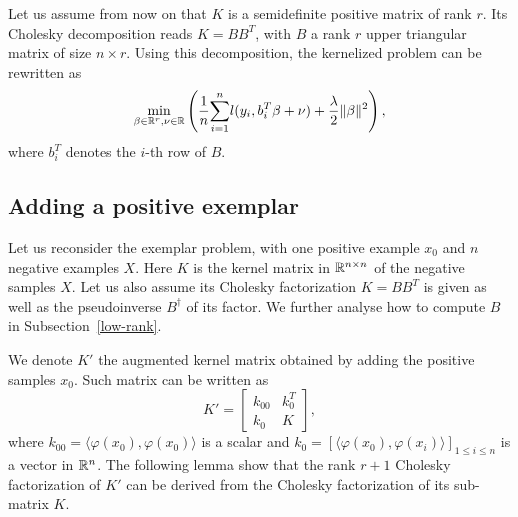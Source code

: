 
Let us assume from now on that $K$ is a semidefinite positive matrix
of rank $r$. Its Cholesky decomposition reads $K=BB^T$, with $B$ a rank $r$ upper triangular matrix of size $n\times r$. Using this decomposition, the kernelized problem can be rewritten as 
\begin{equation}
\min_{\beta\in\mathbb R^r,\nu\in\mathbb R} \left( \dfrac{1}{n}\displaystyle{\sum_{i=1}^n} l(y_i, b_i^T\beta+\nu)+\dfrac{\lambda}{2}\|\beta\|^2\right), \label{beta:first}
\end{equation}
where $b_i^T$ denotes the $i$-th row of $B$.

\subsection{Adding a positive exemplar}
\label{subsec:adding}
Let us reconsider the exemplar problem, with one positive example $x_0$ and $n$ negative examples $X$. Here $K$ is the kernel matrix in $\mathbb R^{n\times n}$ of the negative samples $X$. 
Let us also assume its Cholesky factorization $K=BB^T$ is given as well as the pseudoinverse $B^\dagger$ of its factor. We further analyse how to compute $B$ in Subsection~\ref{low-rank}.

We denote $K'$ the augmented kernel matrix obtained by adding the positive samples $x_0$. Such matrix can be written as
\begin{equation}
K' = \begin{bmatrix}
k_{00} & k_0^T\\
k_0 & K
\end{bmatrix},
\end{equation}
where $k_{00}=\langle \varphi(x_0),\varphi(x_0)\rangle$ is a scalar and $k_0= [\langle \varphi(x_0),\varphi(x_i)\rangle]_{1\le i\le n}$ is a vector in $\mathbb R^n$. 
The following lemma show that the rank $r+1$ Cholesky factorization of $K'$ can be derived from the Cholesky factorization of its sub-matrix $K$.

